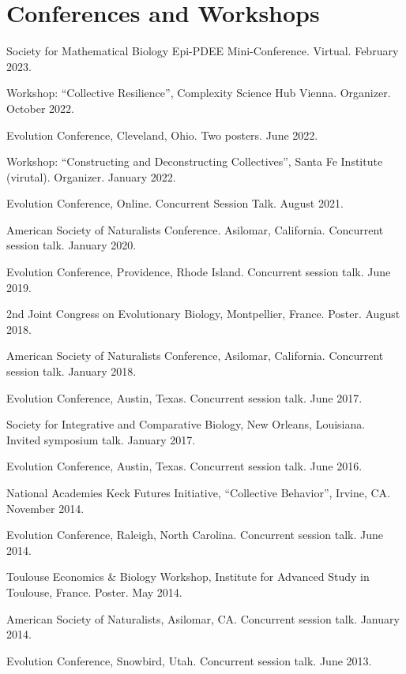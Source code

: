 \documentclass[11pt]{article}
\begin{document}
  \section{Conferences and Workshops}

  \begin{compactlist}
  \item Society for Mathematical Biology Epi-PDEE Mini-Conference. Virtual. February 2023.
  \item Workshop: ``Collective Resilience'', Complexity Science Hub Vienna. Organizer. October 2022.
  \item Evolution Conference, Cleveland, Ohio. Two posters. June 2022.
  \item Workshop: ``Constructing and Deconstructing Collectives'', Santa Fe Institute (virutal). Organizer. January 2022.
  \item Evolution Conference, Online. Concurrent Session Talk. August 2021.
  \item American Society of Naturalists Conference. Asilomar, California. Concurrent session talk. January 2020.
  \item Evolution Conference, Providence, Rhode Island. Concurrent session talk. June 2019.
  \item 2nd Joint Congress on Evolutionary Biology, Montpellier, France. Poster. August 2018.
  \item American Society of Naturalists Conference, Asilomar, California. Concurrent session talk. January 2018.
  \item Evolution Conference, Austin, Texas. Concurrent session talk. June 2017.
  \item Society for Integrative and Comparative Biology, New Orleans, Louisiana.\\
    Invited symposium talk. January 2017.
  \item Evolution Conference, Austin, Texas. Concurrent session talk. June 2016.
  \item National Academies Keck Futures Initiative, ``Collective Behavior'', Irvine, CA. November 2014.
  \item Evolution Conference, Raleigh, North Carolina. Concurrent session talk. June 2014.
  \item Toulouse Economics \& Biology Workshop, Institute for Advanced Study in Toulouse, France. Poster. May 2014.
  \item American Society of Naturalists, Asilomar, CA. Concurrent session talk. January 2014.
  \item Evolution Conference, Snowbird, Utah. Concurrent session talk. June 2013.

\end{compactlist}
\end{document}
